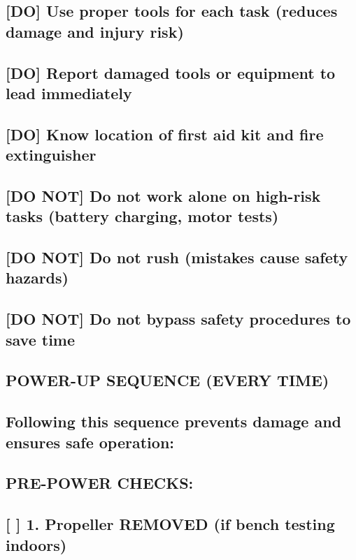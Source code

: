 \documentclass[11pt,letterpaper]{article}
\begin{document}
{{\subsection*{[DO] Use proper tools for each task (reduces damage and injury risk)}

\subsection*{[DO] Report damaged tools or equipment to lead immediately}

\subsection*{[DO] Know location of first aid kit and fire extinguisher}

\subsection*{[DO NOT] Do not work alone on high-risk tasks (battery charging, motor tests)}

\subsection*{[DO NOT] Do not rush (mistakes cause safety hazards)}

\subsection*{[DO NOT] Do not bypass safety procedures to save time}

\subsection*{POWER-UP SEQUENCE (EVERY TIME)}

\subsection*{Following this sequence prevents damage and ensures safe operation:}

\subsection*{PRE-POWER CHECKS:}

\subsection*{[ ] 1. Propeller REMOVED (if bench testing indoors)}

}}
\end{document}
